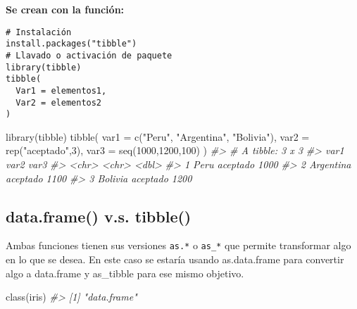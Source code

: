 \documentclass[
]{book}
\newenvironment{Shaded}{\begin{snugshade}}{\end{snugshade}}
\newcommand{\AttributeTok}[1]{\textcolor[rgb]{0.77,0.63,0.00}{#1}}
\newcommand{\CommentTok}[1]{\textcolor[rgb]{0.56,0.35,0.01}{\textit{#1}}}
\newcommand{\DecValTok}[1]{\textcolor[rgb]{0.00,0.00,0.81}{#1}}
\newcommand{\FunctionTok}[1]{\textcolor[rgb]{0.00,0.00,0.00}{#1}}
\newcommand{\NormalTok}[1]{#1}
\newcommand{\StringTok}[1]{\textcolor[rgb]{0.31,0.60,0.02}{#1}}
\begin{document}
\textbf{Se crean con la función:}

\begin{verbatim}
# Instalación
install.packages("tibble")
# Llavado o activación de paquete
library(tibble)
tibble(
  Var1 = elementos1,
  Var2 = elementos2
)
\end{verbatim}

\begin{Shaded}
\begin{Highlighting}[]
\FunctionTok{library}\NormalTok{(tibble)}
\FunctionTok{tibble}\NormalTok{(}
  \AttributeTok{var1 =} \FunctionTok{c}\NormalTok{(}\StringTok{"Peru"}\NormalTok{, }\StringTok{"Argentina"}\NormalTok{, }\StringTok{"Bolivia"}\NormalTok{),}
  \AttributeTok{var2 =} \FunctionTok{rep}\NormalTok{(}\StringTok{"aceptado"}\NormalTok{,}\DecValTok{3}\NormalTok{),}
  \AttributeTok{var3 =} \FunctionTok{seq}\NormalTok{(}\DecValTok{1000}\NormalTok{,}\DecValTok{1200}\NormalTok{,}\DecValTok{100}\NormalTok{)}
\NormalTok{)}
\CommentTok{\#\textgreater{} \# A tibble: 3 x 3}
\CommentTok{\#\textgreater{}   var1      var2      var3}
\CommentTok{\#\textgreater{}   \textless{}chr\textgreater{}     \textless{}chr\textgreater{}    \textless{}dbl\textgreater{}}
\CommentTok{\#\textgreater{} 1 Peru      aceptado  1000}
\CommentTok{\#\textgreater{} 2 Argentina aceptado  1100}
\CommentTok{\#\textgreater{} 3 Bolivia   aceptado  1200}
\end{Highlighting}
\end{Shaded}

\hypertarget{data.frame-v.s.-tibble}{%
\subsection{data.frame() v.s. tibble()}\label{data.frame-v.s.-tibble}}

Ambas funciones tienen sus versiones \texttt{as.*} o \texttt{as\_*} que permite transformar algo en lo que se desea. En este caso se estaría usando as.data.frame para convertir algo a data.frame y as\_tibble para ese mismo objetivo.

\begin{Shaded}
\begin{Highlighting}[]
\FunctionTok{class}\NormalTok{(iris)}
\CommentTok{\#\textgreater{} [1] "data.frame"}
\end{Highlighting}
\end{Shaded}
\end{document}
